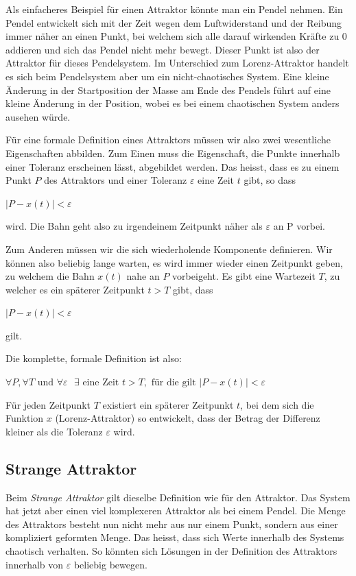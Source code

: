 Als einfacheres Beispiel für einen Attraktor könnte man ein Pendel nehmen. Ein Pendel entwickelt sich mit der Zeit wegen dem Luftwiderstand und der Reibung immer näher an einen Punkt, bei welchem sich alle darauf wirkenden Kräfte zu $0$ addieren und sich das Pendel nicht mehr bewegt. Dieser Punkt ist also der Attraktor für dieses Pendelsystem. Im Unterschied zum Lorenz-Attraktor handelt es sich beim Pendelsystem aber um ein nicht-chaotisches System. Eine kleine Änderung in der Startposition der Masse am Ende des Pendels führt auf eine kleine Änderung in der Position, wobei es bei einem chaotischen System anders ausehen würde. 

Für eine formale Definition eines Attraktors müssen wir also zwei wesentliche Eigenschaften abbilden. Zum Einen muss die Eigenschaft, die Punkte innerhalb einer Toleranz erscheinen lässt, abgebildet werden. Das heisst, dass es zu einem Punkt $P$ des Attraktors  und einer Toleranz $\varepsilon$ eine Zeit $t$ gibt, so dass 

\begin{center}
	$|P - x(t)| < \varepsilon$
\end{center}
wird. Die Bahn geht also zu irgendeinem Zeitpunkt näher als $\varepsilon$ an P vorbei.

Zum Anderen müssen wir die sich wiederholende Komponente definieren. Wir können also beliebig lange warten, es wird immer wieder einen Zeitpunkt geben, zu welchem die Bahn $x(t)$ nahe an $P$ vorbeigeht. Es gibt eine Wartezeit $T$, zu welcher es ein späterer Zeitpunkt $t > T$ gibt, dass
\begin{center}
	$|P - x(t) |< \varepsilon$
\end{center}
gilt.

Die komplette, formale Definition ist also:

\begin{center}\label{Attraktor}
$\forall P, \forall T \text{ und } \forall \varepsilon \text{ } \exists \text{ eine Zeit }t > T , \text{ für die gilt } |P - x(t) |< \varepsilon$
\end{center}

Für jeden Zeitpunkt $T$ existiert ein späterer Zeitpunkt $t$, bei dem sich die Funktion $x$ (Lorenz-Attraktor) so entwickelt, dass der Betrag der Differenz kleiner als die Toleranz $\varepsilon$ wird. 


\subsection{Strange Attraktor}
%
Beim {\em Strange Attraktor} gilt dieselbe Definition wie für den Attraktor. Das System hat jetzt aber einen viel komplexeren Attraktor als bei einem Pendel. Die Menge des Attraktors besteht nun nicht mehr aus nur einem Punkt, sondern aus einer kompliziert geformten Menge. Das heisst, dass sich Werte innerhalb des Systems chaotisch verhalten. So könnten sich Lösungen in der Definition des Attraktors innerhalb von $\varepsilon$ beliebig bewegen. 
